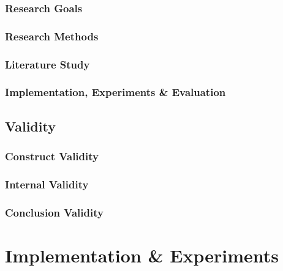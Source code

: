 \documentclass{kththesis}
\theoremstyle{definition}
\begin{document}
\subsection{Research Goals}

\subsection{Research Methods}

\subsection{Literature Study}

\subsection{Implementation, Experiments \& Evaluation}

\section{Validity}

\subsection{Construct Validity}

\subsection{Internal Validity}

\subsection{Conclusion Validity}

\chapter{Implementation \& Experiments}
\end{document}

